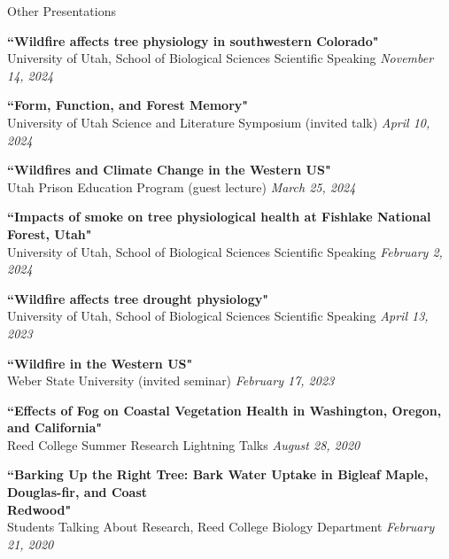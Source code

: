 \documentclass{resume} %
\begin{document}
\begin{rSection}{Other Presentations}

{\bf ``Wildfire affects tree physiology in southwestern Colorado" }\\ 
\hspace*{0.25em}
University of Utah, School of Biological Sciences Scientific Speaking \hfill {\em November 14, 2024} 

{\bf ``Form, Function, and Forest Memory" }\\ 
\hspace*{0.25em}
University of Utah Science and Literature Symposium (invited talk) \hfill {\em April 10, 2024} 

{\bf ``Wildfires and Climate Change in the Western US" }\\ \hspace*{0.25em}
Utah Prison Education Program (guest lecture) \hfill {\em March 25, 2024}

{\bf ``Impacts of smoke on tree physiological health at Fishlake National Forest, Utah" }\\ 
\hspace*{0.25em}
University of Utah, School of Biological Sciences Scientific Speaking \hfill {\em February 2, 2024} 

{\bf ``Wildfire affects tree drought physiology" }\\ 
\hspace*{0.25em}
University of Utah, School of Biological Sciences Scientific Speaking \hfill {\em April 13, 2023} 

{\bf ``Wildfire in the Western US" }\\ 
\hspace*{0.25em}
Weber State University (invited seminar) \hfill {\em February 17, 2023} 

{\bf ``Effects of Fog on Coastal Vegetation Health in Washington, Oregon, and California"} \\ \hspace*{0.25em}
Reed College Summer Research Lightning Talks \hfill {\em August 28, 2020}

{\bf ``Barking Up the Right Tree: Bark Water Uptake in Bigleaf Maple, Douglas-fir, and Coast \\ \hspace*{0.25em}  Redwood"} \\ 
\hspace*{0.25em}
Students Talking About Research, Reed College Biology Department \hfill {\em February 21, 2020}


\end{rSection}
\end{document}
